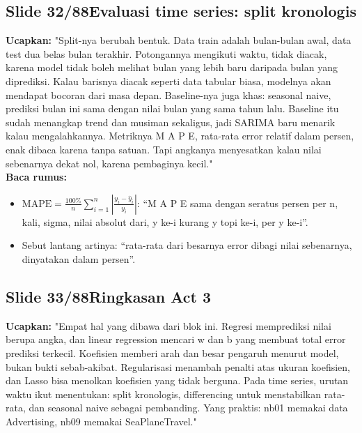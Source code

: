 \documentclass[11pt]{article}
\renewcommand{\framebox}[1]{\colorbox{acc!15}{\textcolor{acc}{\textbf{#1}}}}
\begin{document}
\subsection*{\framebox{Slide 32/88}\quad Evaluasi time series: split kronologis}
\textbf{Ucapkan:} "Split-nya berubah bentuk. Data train adalah bulan-bulan awal, data test dua belas bulan terakhir. Potongannya mengikuti waktu, tidak diacak, karena model tidak boleh melihat bulan yang lebih baru daripada bulan yang diprediksi. Kalau barisnya diacak seperti data tabular biasa, modelnya akan mendapat bocoran dari masa depan. Baseline-nya juga khas: seasonal naive, prediksi bulan ini sama dengan nilai bulan yang sama tahun lalu. Baseline itu sudah menangkap trend dan musiman sekaligus, jadi SARIMA baru menarik kalau mengalahkannya. Metriknya M A P E, rata-rata error relatif dalam persen, enak dibaca karena tanpa satuan. Tapi angkanya menyesatkan kalau nilai sebenarnya dekat nol, karena pembaginya kecil."\\[2pt]
\textbf{Baca rumus:}\\[2pt]
\begin{itemize}\setlength\itemsep{0.2em}
\item $\text{MAPE} = \frac{100\%}{n}\sum_{i=1}^{n}\left|\frac{y_i - \hat{y}_i}{y_i}\right|$: ``M A P E sama dengan seratus persen per n, kali, sigma, nilai absolut dari, y ke-i kurang y topi ke-i, per y ke-i''.
\item Sebut lantang artinya: ``rata-rata dari besarnya error dibagi nilai sebenarnya, dinyatakan dalam persen''.
\end{itemize}

\subsection*{\framebox{Slide 33/88}\quad Ringkasan Act 3}
\textbf{Ucapkan:} "Empat hal yang dibawa dari blok ini. Regresi memprediksi nilai berupa angka, dan linear regression mencari w dan b yang membuat total error prediksi terkecil. Koefisien memberi arah dan besar pengaruh menurut model, bukan bukti sebab-akibat. Regularisasi menambah penalti atas ukuran koefisien, dan Lasso bisa menolkan koefisien yang tidak berguna. Pada time series, urutan waktu ikut menentukan: split kronologis, differencing untuk menstabilkan rata-rata, dan seasonal naive sebagai pembanding. Yang praktis: nb01 memakai data Advertising, nb09 memakai SeaPlaneTravel."\\[2pt]
\end{document}
